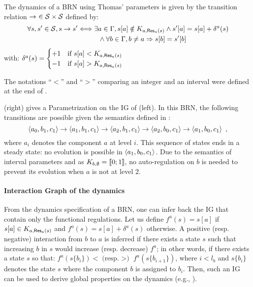 \begin{definition}\label{def:dynamics}
The dynamics of a BRN using Thomas' parameters is given by the transition relation $\rightarrow\ \in \mathcal{S} \times \mathcal{S}$ defined by:
\begin{align*}
  \forall s, s' \in \mathcal{S}, s \rightarrow s' &\Longleftrightarrow \exists a \in \Gamma,
  {s[a]} \notin K_{a, \mathsf{Res}_{a}(s)} \wedge {s'[a]} = {s[a]} + \delta^a(s) \\
    & \qquad\quad \wedge \forall b \in \Gamma, b \neq a \Rightarrow {s[b]} = {s'[b]}
\end{align*}
with: $\delta^a(s) = 
  \begin{cases}
    +1 & \text{if } {s[a]} < K_{a, \mathsf{Res}_{a}(s)} \\
    -1 & \text{if } {s[a]} > K_{a, \mathsf{Res}_{a}(s)} \\
  \end{cases}$
\end{definition}
The notations “$<$” and “$>$” comparing an integer and an interval were defined at the end of .



\begin{example}
(right) gives a Parametrization on the IG of (left).
In this BRN, the following transitions are possible given the semantics defined in :
$$\mbox{$\langle a_0, b_1, c_1 \rangle$} \rightarrow \mbox{$\langle a_1, b_1, c_1 \rangle$} \rightarrow \mbox{$\langle a_2, b_1, c_1 \rangle$} \rightarrow
\mbox{$\langle a_2, b_0, c_1 \rangle$} \rightarrow \mbox{$\langle a_1, b_0, c_1 \rangle$} \enspace,$$
where $a_i$ denotes the component $a$ at level $i$.
This sequence of states ends in a steady state: no evolution is possible in $\mbox{$\langle a_1, b_0, c_1 \rangle$}$.
Due to the semantics of interval parameters and as $K_{b,\emptyset} = \llbracket 0 ; 1 \rrbracket$, no auto-regulation on $b$ is needed to prevent its evolution when $a$ is not at level $2$.
\end{example}



\paragraph{Interaction Graph of the dynamics}
From the dynamics specification of a BRN, one can infer back the IG that contain only the functional
regulations.
Let us define
$f^a(s) = s[a]$ if $s[a]\in K_{a, \mathsf{Res}_{a}(s)}$
and
$f^a(s) = s[a]+\delta^a(s)$ otherwise.
A positive (resp. negative) interaction from $b$ to $a$ is inferred if there exists a state $s$ such
that increasing $b$ in $s$ would increase (resp. decrease) $f^a$; in other words, if
there exists a state $s$ so that:
$f^a(s\{b_i\}) < \text{(resp. $>$) } f^a(s\{b_{i+1}\})$, 
where $i < l_b$ and $s\{b_i\}$ denotes the state $s$ where the component $b$ is assigned to $b_i$.
Then, such an IG can be used to derive global properties on the dynamics
(e.g., \cite{Richard2010378,PR11-SASB}).

